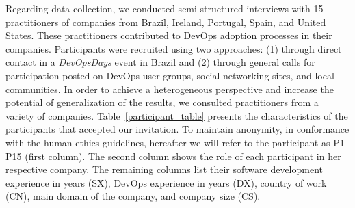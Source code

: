 

Regarding data collection, we conducted semi-structured interviews with 15 practitioners of companies from
Brazil, Ireland, Portugal, Spain, and United States. These practitioners
contributed to DevOps adoption processes in their companies. Participants
were recruited using two approaches: (1) through direct contact in a \emph{DevOpsDays}
event in Brazil and (2) through  general
calls for participation posted on DevOps user groups, social networking sites,
and local communities. In order to achieve a heterogeneous perspective
and increase the potential of generalization of the results,
we consulted practitioners from a variety of companies.
Table~\ref{participant_table} presents the characteristics of the participants
that accepted our invitation.
To maintain anonymity, in conformance with the human ethics guidelines,
hereafter we will refer to the participant as P1--P15 (first column).
The second column shows the role of
each participant in her respective company. The remaining columns list their
software development experience in years (SX), DevOps experience in years (DX),
country of work (CN), main domain of the company, and company size (CS).


